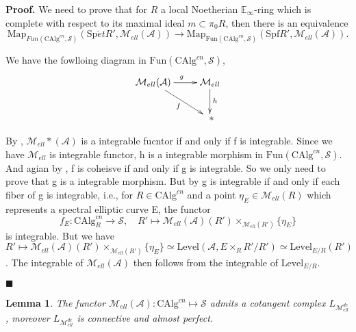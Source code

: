 \documentclass[12pt]{article}
\newtheorem{lemma}[theorem]{Lemma}
\theoremstyle{thry}
\renewenvironment{proof}
{\par \noindent \textbf{Proof.}}
{ \par \hfill $\blacksquare$ \quad \par }
\def  \CAlg     {\mathrm{CAlg}}
\def  \Fun      {\mathrm{Fun}}
\def  \Level    {\mathrm{Level}}
\def  \Map      {\mathrm{Map}}
\def  \Spet     {\mathrm{Sp}\acute{e}t}
\def  \Spf      {\mathrm{Spf}}
\def  \ca       {\mathcal{A}}
\def  \cm       {\mathcal{M}}
\def  \cs       {\mathcal{S}}
\def  \be       {\mathbb{E}}
\begin{document}
\begin{proof}
	We need to prove that for $R$ a local Noetherian $\be_{\infty}$-ring which is complete with respect to its maximal ideal $m \subset \pi_0 R$, then there is an equivalence
	$$
	\Map_{Fun(\CAlg^{cn},\cs)}(\Spet R', \cm_{ell}(\ca)) \to   \Map_{\Fun(\CAlg^{cn},\cs)}(\Spf R', \cm_{ell}(\ca)).
	$$
	
	We have the fowlloing diagram in $\Fun(\CAlg^{cn}, \cs)$,
	$$
	\xymatrix{
		\cm_{ell}(\ca)  \ar[r]^{g} \ar[rd]_{f}  &  \cm_{ell}  \ar[d]^{h} \\
		&   \ *   \\
	}
	$$
	
	By \cite[Remark 17.3.7.3]{lu-SAG}, $\cm_{ell}*(\ca)$ is a integrable fucntor if and only if f is integrable. Since we  have $\cm_{ell}$ is integrable functor, h is a integrable morphism in $\Fun(\CAlg^{cn}, \cs)$. And agian by \cite[Remark 17.3.7.3]{lu-SAG}, f is coheisve if and only if g is integrable. So we only need to prove that g is a integrable morphism. But by \cite[Proposition 17.3.8.4]{lu-SAG}  g is integrable  if  and only if each fiber of g is integrable, i.e., for $R \in \CAlg^{cn}$ and a point $\eta_E \in \cm_{ell}(R)$ which represents a spectral elliptic curve E,  the functor
	$$
	f_{E}: \CAlg^{cn}_R \to \cs, \quad   R' \mapsto  \cm_{ell}(\ca)(R') \times_{\cm_{ell}(R')}\{\eta_E\}
	$$
	is integrable. But we have $R' \mapsto  \cm_{ell}(\ca)(R') \times_{\cm_{ell}(R')}\{\eta_E\} \simeq \Level(\ca, E \times_R R'/R') \simeq \Level_{E/R}(R')$.  The integrable of $\cm_{ell}(\ca)$  then follows from the integrable of $\Level_{E/R}$.
	
\end{proof}

\begin{lemma}
	The functor $\cm_{ell}(\ca): \CAlg^{cn}  \mapsto  \cs$  admits a cotangent complex $L_{\cm^{de}_{ell}}$, moreover $L_{\cm^{de}_{ell}}$ is connective and almost perfect. 
\end{lemma}
\end{document}
